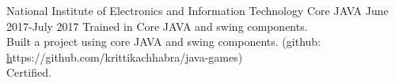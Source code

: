
\begin{entryzlist}
\entryz

{National Institute of Electronics and Information Technology {\normalfont  Core JAVA }}
{June 2017-July 2017}
{Trained in Core JAVA and swing components.
\\
Built a project using core JAVA and swing components. 
(github: \href{https://github.com/krittikachhabra/java-games}https://github.com/krittikachhabra/java-games)
\\
Certified.
}


\end{entryzlist}
